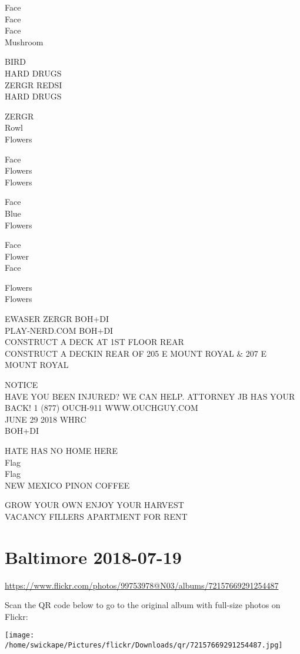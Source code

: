 \documentclass[10pt,letterpaper]{article}
\begin{document}
Face\\
Face\\
Face\\
Mushroom

BIRD\\
HARD DRUGS\\
ZERGR REDSI\\
HARD DRUGS

ZERGR\\
Rowl\\
Flowers

Face\\
Flowers\\
Flowers

Face\\
Blue\\
Flowers

Face\\
Flower\\
Face

Flowers\\
Flowers

EWASER ZERGR BOH+DI\\
PLAY{-}NERD.COM BOH+DI\\
CONSTRUCT A DECK AT 1ST FLOOR REAR\\
CONSTRUCT A DECKIN REAR OF 205 E MOUNT ROYAL \& 207 E MOUNT ROYAL

NOTICE\\
HAVE YOU BEEN INJURED?  WE CAN HELP.  ATTORNEY JB HAS YOUR BACK!  1 (877) OUCH{-}911 WWW.OUCHGUY.COM\\
JUNE 29 2018 WHRC\\
BOH+DI

HATE HAS NO HOME HERE\\
Flag\\
Flag\\
NEW MEXICO PINON COFFEE

GROW YOUR OWN ENJOY YOUR HARVEST\\
VACANCY FILLERS APARTMENT FOR RENT
\pagebreak

\section*{Baltimore 2018-07-19}

\url{https://www.flickr.com/photos/99753978@N03/albums/72157669291254487}

Scan the QR code below to go to the original album with full-size photos on Flickr:

\texttt{[image: /home/swickape/Pictures/flickr/Downloads/qr/72157669291254487.jpg]}
\pagebreak
\end{document}
